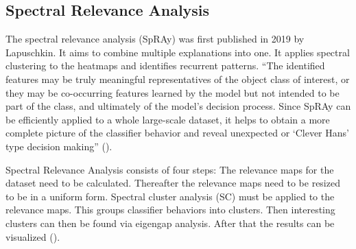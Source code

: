 \subsection{Spectral Relevance Analysis}
The spectral relevance analysis (SpRAy) was first published in 2019 by Lapuschkin. It aims to combine multiple explanations into one. It applies spectral clustering to the heatmaps and identifies recurrent patterns. “The identified features may be truly meaningful representatives of the object class of interest, or they may be co-occurring features learned by the model but not intended to be part of the class, and ultimately of the model’s decision process. Since SpRAy can be efficiently applied to a whole large-scale dataset, it helps to obtain a more complete picture of the classifier behavior and reveal unexpected or ‘Clever Hans’ type decision making” ().
\par
Spectral Relevance Analysis consists of four steps:
The relevance maps for the dataset need to be calculated.
Thereafter the relevance maps need to be resized to be in a uniform form.
Spectral cluster analysis (SC) must be applied to the relevance maps. This groups classifier behaviors into clusters.
Then interesting clusters can then be found via eigengap analysis.
After that the results can be visualized ().

